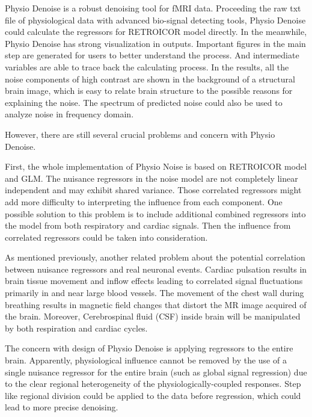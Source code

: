 Physio Denoise is a robust denoising tool for fMRI data. 
Proceeding the raw txt file of physiological data with advanced bio-signal detecting tools, 
Physio Denoise could calculate the regressors for RETROICOR model directly.
In the meanwhile, Physio Denoise has strong visualization in outputs.
Important figures in the main step are generated for users to better understand the process.
And intermediate variables are able to trace back the calculating process.
In the results, all the noise components of high contrast 
are shown in the background of a structural brain image, which
is easy to relate brain structure to the possible reasons for explaining the noise.
The spectrum of predicted noise could also be used to analyze noise in frequency domain.

However, there are still several crucial problems and concern with Physio Denoise.

First, the whole implementation of Physio Noise is based on RETROICOR model and GLM. 
The nuisance regressors in the noise model are not completely linear independent 
and may exhibit shared variance. \cite{bright2017potential} 
Those correlated regressors might 
add more difficulty to interpreting the influence from each component.
One possible solution to this problem is to include additional combined regressors into the model
from both respiratory and cardiac signals. Then the influence from correlated regressors 
could be taken into consideration. 

As mentioned previously, another related problem about the potential correlation 
between nuisance regressors and real neuronal events. 
Cardiac pulsation results in brain tissue movement and 
inflow effects leading to correlated signal fluctuations primarily 
in and near large blood vessels. \cite{dagli1999localization} The movement of the chest wall during breathing results 
in magnetic field changes that distort the MR image acquired of the brain. \cite{brosch2002simulation}
Moreover, Cerebrospinal fluid (CSF) inside brain will be manipulated by both respiration and cardiac cycles.

The concern with design of Physio Denoise is applying regressors to the entire brain. 
Apparently, physiological influence cannot be removed by the use of a single nuisance regressor 
for the entire brain (such as global signal regression) due to the 
clear regional heterogeneity of the physiologically-coupled responses. \cite{chen2020resting}
Step like regional division could be applied to the data before regression, which could lead to more precise
denoising.

